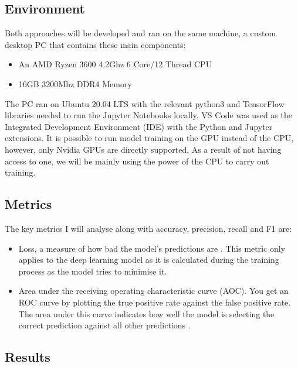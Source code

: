 \documentclass[12pt,a4paper]{report}
\begin{document}
\subsection{Environment}

\label{subsec:env}

Both approaches will be developed and ran on the same machine, a custom desktop PC that contains these main components: 

\begin{itemize}
    \item An AMD Ryzen 3600 4.2Ghz 6 Core/12 Thread CPU
    \item 16GB 3200Mhz DDR4 Memory
\end{itemize}

The PC ran on Ubuntu 20.04 LTS with the relevant python3 and TensorFlow libraries needed to run the Jupyter Notebooks 
locally. VS Code was used as the Integrated Development Environment (IDE) with the Python and Jupyter extensions.  It is
possible to run model training on the GPU instead of the CPU, however, only Nvidia GPUs are directly supported. As a 
result of not having access to one, we will be mainly using the power of the CPU to carry out training.

\subsection{Metrics}

The key metrics I will analyse along with accuracy, precision, recall and F1 are: 

\begin{itemize}
    \item Loss, a measure of how bad the model's predictions are \citep{googletrainloss}. 
    This metric only applies to the deep learning model as it is calculated during the training process as the model 
    tries to minimise it.
    \item Area under the receiving operating characteristic curve (AOC). You get an ROC curve by plotting the true 
    positive rate against the false positive rate. The area under this curve indicates how well the model is selecting 
    the correct prediction against all other predictions \citep{googleroc}.
\end{itemize}

\subsection{Results}
\end{document}
